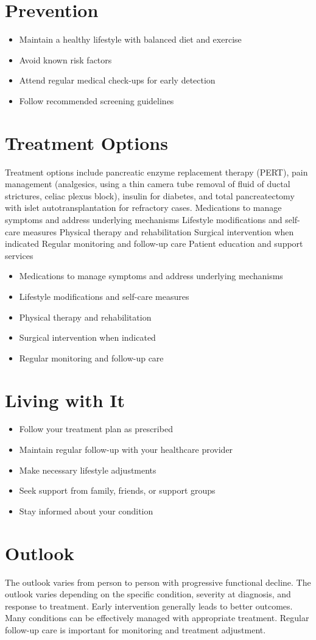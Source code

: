 \section{Prevention}
\begin{itemize}[noitemsep]
  \item Maintain a healthy lifestyle with balanced diet and exercise
  \item Avoid known risk factors
  \item Attend regular medical check-ups for early detection
  \item Follow recommended screening guidelines
\end{itemize}
\section{Treatment Options}
Treatment options include pancreatic enzyme replacement therapy (PERT), pain management (analgesics, using a thin camera tube removal of fluid of ductal strictures, celiac plexus block), insulin for diabetes, and total pancreatectomy with islet autotransplantation for refractory cases. Medications to manage symptoms and address underlying mechanisms Lifestyle modifications and self-care measures Physical therapy and rehabilitation Surgical intervention when indicated Regular monitoring and follow-up care Patient education and support services

\begin{itemize}[noitemsep]
  \item Medications to manage symptoms and address underlying mechanisms
  \item Lifestyle modifications and self-care measures
  \item Physical therapy and rehabilitation
  \item Surgical intervention when indicated
  \item Regular monitoring and follow-up care
\end{itemize}
\section{Living with It}
\begin{itemize}[noitemsep]
  \item Follow your treatment plan as prescribed
  \item Maintain regular follow-up with your healthcare provider
  \item Make necessary lifestyle adjustments
  \item Seek support from family, friends, or support groups
  \item Stay informed about your condition
\end{itemize}
\section{Outlook}
The outlook varies from person to person with progressive functional decline. The outlook varies depending on the specific condition, severity at diagnosis, and response to treatment. Early intervention generally leads to better outcomes. Many conditions can be effectively managed with appropriate treatment. Regular follow-up care is important for monitoring and treatment adjustment.
